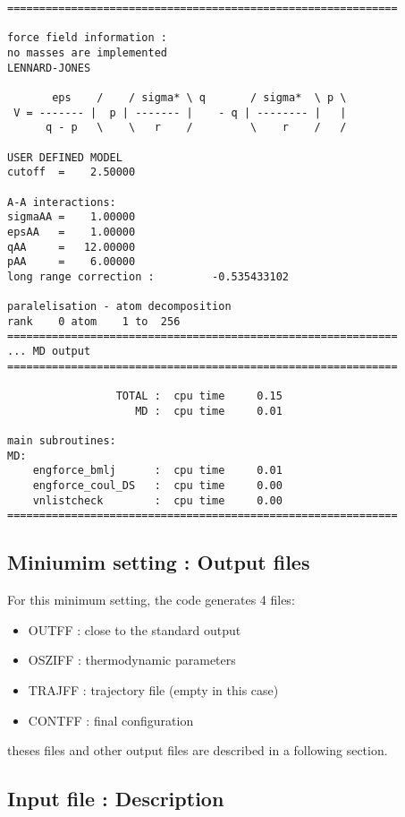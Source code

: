 \documentclass[a4paper]{article}
\begin{document}
\begin{verbatim}
=============================================================

force field information :                      
no masses are implemented                      
LENNARD-JONES                  

       eps    /    / sigma* \ q       / sigma*  \ p \
 V = ------- |  p | ------- |    - q | -------- |   |
      q - p   \    \   r    /         \    r    /   /

USER DEFINED MODEL                             
cutoff  =    2.50000

A-A interactions:
sigmaAA =    1.00000
epsAA   =    1.00000
qAA     =   12.00000
pAA     =    6.00000
long range correction :         -0.535433102
 
paralelisation - atom decomposition
rank    0 atom    1 to  256
=============================================================
... MD output
=============================================================

                 TOTAL :  cpu time     0.15
                    MD :  cpu time     0.01

main subroutines:
MD:
    engforce_bmlj      :  cpu time     0.01
    engforce_coul_DS   :  cpu time     0.00
    vnlistcheck        :  cpu time     0.00
=============================================================
\end{verbatim}

\subsection{Miniumim setting : Output files}
For this minimum setting, the code generates 4 files:

\begin{itemize}
\item OUTFF  : close to the standard output
\item OSZIFF : thermodynamic parameters 
\item TRAJFF : trajectory file (empty in this case) 
\item CONTFF : final configuration
\end{itemize}
theses files and other output files are described in a following section.

\subsection{Input file : Description}

\end{document}
